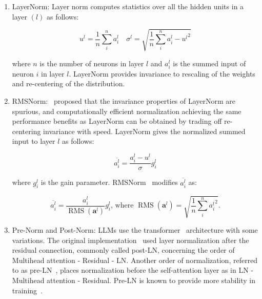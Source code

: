 \documentclass[a4paper,oneside]{book}
\begin{document}
\begin{enumerate}
    \item LayerNorm: Layer norm computes statistics over all the hidden units in a layer $(l)$ as follows:

    \begin{equation}
        u^{l} = \frac{1}{n} \sum_{i}^{n} a_{i}^{l} \quad \sigma^{l} = \sqrt{\frac{1}{n} \sum_{i}^{n}{a_{i}^{l}-u^{l}}^{2}}
    \end{equation}

    where $n$ is the number of neurons in layer $l$ and $a_{i}^{l}$ is the summed input of neuron $i$ in layer $l$. LayerNorm provides invariance to rescaling of the weights and re-centering of the distribution.

    \item RMSNorm:~\cite{zhang2019root} proposed that the invariance properties of LayerNorm are spurious, and computationally efficient normalization achieving the same performance benefits as LayerNorm can be obtained by trading off re-centering invariance with speed. LayerNorm gives the normalized summed input to layer $l$ as follows:

    \begin{equation}
        \overline{a_{i}^{l}} = \frac{a_{i}^{l}-u^{l}}{\sigma} g_{i}^{l}
    \end{equation}

    where $g_{i}^{l}$ is the gain parameter. RMSNorm~\cite{zhang2019root} modifies $\overline{a_{i}^{l}}$ as:

    \begin{equation}
        \overline{a_{i}^{l}} = \frac{a_{i}^{l}}{\operatorname{RMS}\left(\mathbf{a}^{l}\right)} g_{i}^{l} \text {, where } \operatorname{RMS}\left(\mathbf{a}^{l}\right) = \sqrt{\frac{1}{n} \sum_{i}^{n}{a_{i}^{l}}^{2}}.
    \end{equation}

    \item Pre-Norm and Post-Norm: LLMs use the transformer~\cite{vaswani2017attention} architecture with some variations. The original implementation~\cite{vaswani2017attention} used layer normalization after the residual connection, commonly called post-LN, concerning the order of Multihead attention - Residual - LN. Another order of normalization, referred to as pre-LN~\cite{baevski2018adaptive}, places normalization before the self-attention layer as in LN - Multihead attention - Residual. Pre-LN is known to provide more stability in training~\cite{shleifer2021normformer}.


\end{enumerate}
\end{document}
